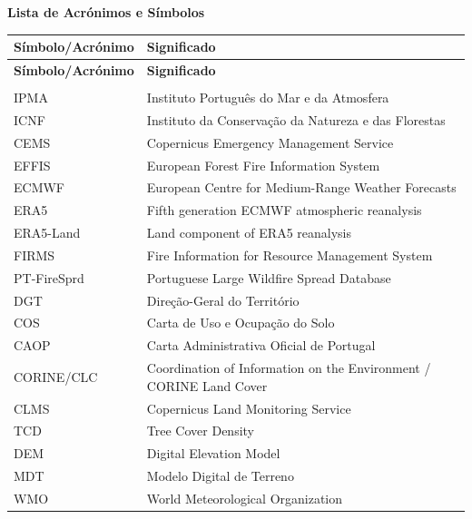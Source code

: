 \clearpage
{}
{}

{\Large\bfseries Lista de Acrónimos e Símbolos\par}
\vspace{0.8em}

\begingroup
\footnotesize
\setlength{\tabcolsep}{3pt}
\renewcommand{\arraystretch}{0.92}
\setlength{\LTleft}{0pt}
\setlength{\LTright}{0pt}

\begin{longtable}{@{}>{\raggedright\arraybackslash}p{}>{\raggedright\arraybackslash}p{}@{}}
\hline
\textbf{Símbolo/Acrónimo} & \textbf{Significado} \\
\hline
\endfirsthead
\hline
\textbf{Símbolo/Acrónimo} & \textbf{Significado} \\
\hline
\endhead
\hline
\endfoot
\multicolumn{2}{l}{\textbf{Instituições, plataformas e datasets}} \\
IPMA & Instituto Português do Mar e da Atmosfera \\
ICNF & Instituto da Conservação da Natureza e das Florestas \\
CEMS & Copernicus Emergency Management Service \\
EFFIS & European Forest Fire Information System \\
ECMWF & European Centre for Medium-Range Weather Forecasts \\
ERA5 & Fifth generation ECMWF atmospheric reanalysis \\
ERA5-Land & Land component of ERA5 reanalysis \\
FIRMS & Fire Information for Resource Management System \\
PT-FireSprd & Portuguese Large Wildfire Spread Database \\
DGT & Direção-Geral do Território \\
COS & Carta de Uso e Ocupação do Solo \\
CAOP & Carta Administrativa Oficial de Portugal \\
CORINE/CLC & Coordination of Information on the Environment / CORINE Land Cover \\
CLMS & Copernicus Land Monitoring Service \\
TCD & Tree Cover Density \\
DEM & Digital Elevation Model \\
MDT & Modelo Digital de Terreno \\
WMO & World Meteorological Organization \\

\end{longtable}
